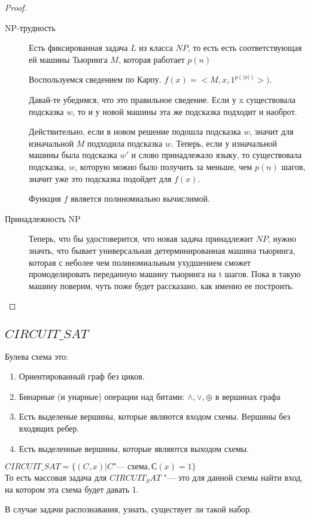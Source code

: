 \begin{proof}
	\begin{description}
	\item[NP-трудность]
	Есть фиксированная задача $L$ из класса $NP$, то есть есть соответствующая ей машины Тьюринга $M$, которая работает $p(n)$
	
	Воспользуемся сведением по Карпу. $f(x) = <M, x, 1^{p(|x|)}>)$.

	Давай-те убедимся, что это правильное сведение. Если у x существовала подсказка $w$, то и у новой машины
	эта же подсказка подходит и наоброт.

        Действительно, если в новом решение подошла подсказка $w$, значит для изначальной $M$ подходила подсказка $w$.
        Теперь, если у изначальной машины была подсказка $w'$ и слово принадлежало языку, то существовала подсказка,
        $w$, которую можно было получить за меньше, чем $p(n)$ шагов, значит уже это подсказка подойдет для $f(x)$.

        Функция $f$ является полиномиально вычислимой.
          
	\item[Принадлежность NP]
	Теперь, что бы удостоверится, что новая задача принадлежит $NP$, нужно значть, что 
	бывает универсальная детерминированная машина тьюринга, которая с неболее чем полиномиальным ухудшением 
	сможет промоделировать переданную машину тьюринга на t шагов. Пока в такую машину поверим, чуть поже будет рассказано,
	как именно ее построить.  
	\end{description}
\end{proof}

\subsection{$CIRCUIT\_SAT$}
\begin{Def}
	Булева схема это:
	\begin{enumerate}
	\item Ориентированный граф без циков.
	\item Бинарные (и унарные) операции над битами: $\wedge, \vee, \oplus$
	в вершинах графа
	\item Есть выделеные вершины, которые являются входом схемы. Вершины без входящих ребер.
	\item Есть выделенные вершины, которые являются выходом схемы.
	\end{enumerate} 
\end{Def}

\begin{Def}
	$CIRCUIT\_SAT = \{(C, x)|C \text{"--- схема}, С(x) = 1\}$\\
	То есть массовая задача для $CIRCUIT_SAT$ "--- это для данной схемы найти вход, на котором эта схема будет давать 1.

	В случае задачи распознавания, узнать, существует ли такой набор. 
\end{Def}

